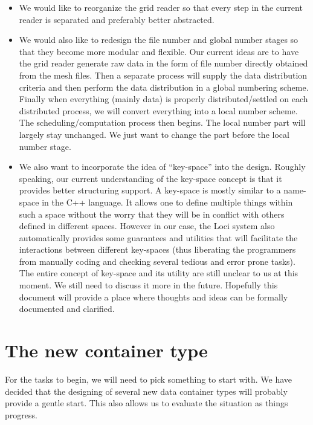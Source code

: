 \documentclass{article}
\begin{document}
\begin{itemize}
  \item We would like to reorganize the grid reader so that every step
    in the current reader is separated and preferably better abstracted.
  \item We would also like to redesign the file number and global number
    stages so that they become more modular and flexible.  Our current
    ideas are to have the grid reader generate raw data in the form of
    file number directly obtained from the mesh files.  Then a separate
    process will supply the data distribution criteria and then perform
    the data distribution in a global numbering scheme.  Finally when
    everything (mainly data) is properly distributed/settled on each
    distributed process, we will convert everything into a local number
    scheme.  The scheduling/computation process then begins.  The local
    number part will largely stay unchanged.  We just want to change the
    part before the local number stage.
  \item We also want to incorporate the idea of ``key-space'' into
    the design.  Roughly speaking, our current understanding of the
    key-space concept is that it provides better structuring support.  A
    key-space is mostly similar to a name-space in the C++ language.  It
    allows one to define multiple things within such a space without the
    worry that they will be in conflict with others defined in different
    spaces.  However in our case, the Loci system also automatically
    provides some guarantees and utilities that will facilitate the
    interactions between different key-spaces (thus liberating the
    programmers from manually coding and checking several tedious and
    error prone tasks). The entire concept of key-space and its utility
    are still unclear to us at this moment.  We still need to discuss it
    more in the future.  Hopefully this document will provide a place
    where thoughts and ideas can be formally documented and clarified.
\end{itemize}

\section{The new container type}
\label{section::container-type}
For the tasks to begin, we will need to pick something to start with.
We have decided that the designing of several new data container types
will probably provide a gentle start.  This also allows us to evaluate
the situation as things progress.
\end{document}
